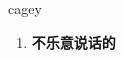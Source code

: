 
\begin{frame}
{\huge cagey}
\begin{center}
\begin{enumerate}\Large
  \item \textbf{不乐意说话的}
\end{enumerate}
\end{center}
\end{frame}

